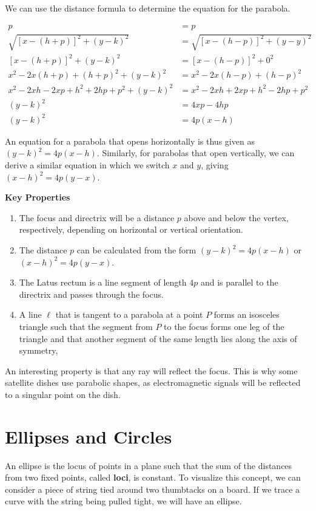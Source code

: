 \documentclass[11pt]{article}
\begin{document}
We can use the distance formula to determine the equation for the parabola.

\begin{align*}
    p &= p \\
    \sqrt{[x - (h+p)]^2 + (y - k)^2} &= \sqrt{[x - (h - p)]^2 + (y-y)^2} \\
    [x - (h + p)]^2 + (y-k)^2 &= [x - (h-p)]^2 + 0^2 \\
    x^2 - 2x(h+p) + (h+p)^2 + (y-k)^2 &= x^2 - 2x(h-p) + (h-p)^2 \\
    x^2 - 2xh - 2xp + h^2 + 2hp + p^2 + (y-k)^2 &= x^2 -2xh + 2xp + h^2 - 2hp + p^2 \\
    (y-k)^2 &= 4xp - 4hp \\
    (y-k)^2 &= 4p(x - h)
\end{align*}

An equation for a parabola that opens horizontally is thus given as $(y-k)^2 = 4p(x - h)$. Similarly, for parabolas that open vertically, we can derive a similar equation in which we switch $x$ and $y$, giving $(x-h)^2 = 4p(y - x)$.

\textbf{Key Properties}
\begin{enumerate}
    \item The focus and directrix will be a distance $p$ above and below the vertex, respectively, depending on horizontal or vertical orientation.
    \item The distance $p$ can be calculated from the form $(y-k)^2 = 4p(x - h)$ or $(x-h)^2 = 4p(y - x)$.
    \item The Latus rectum is a line segment of length $4p$ and is parallel to the directrix and passes through the focus. 
    \item A line $\ell$ that is tangent to a parabola at a point $P$ forms an isosceles triangle such that the segment from $P$ to the focus forms one leg of the triangle and that another segment of the same length lies along the axis of symmetry,
\end{enumerate}

An interesting property is that any ray will reflect the focus. This is why some satellite dishes use parabolic shapes, as electromagnetic signals will be reflected to a singular point on the dish. 

\section{Ellipses and Circles}

An ellipse is the locus of points in a plane such that the sum of the distances from two fixed points, called \textbf{loci}, is constant. To visualize this concept, we can consider a piece of string tied around two thumbtacks on a board. If we trace a curve with the string being pulled tight, we will have an ellipse. 
\end{document}
